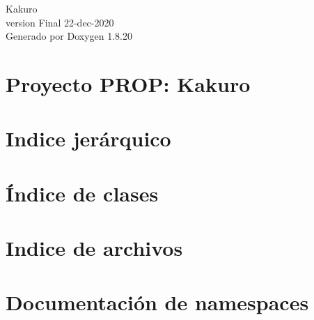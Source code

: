 \let\mypdfximage\pdfximage\def\pdfximage{\immediate\mypdfximage}\documentclass[twoside]{book}
\newcommand{\+}{\discretionary{\mbox{\scriptsize$\hookleftarrow$}}{}{}}
\newcommand{\clearemptydoublepage}{%
  \newpage{\pagestyle{empty}\cleardoublepage}%
}
\begin{document}
\hypersetup{pageanchor=false,
             bookmarksnumbered=true,
             pdfencoding=unicode
            }
\begin{titlepage}
\vspace*{7cm}
\begin{center}%
{\Large Kakuro \\[1ex]\large version Final 22-\/dec-\/2020 }\\
\vspace*{1cm}
{\large Generado por Doxygen 1.8.20}\\
\end{center}
\end{titlepage}
\clearemptydoublepage
{}
\tableofcontents
\clearemptydoublepage
{}
\hypersetup{pageanchor=true}

\chapter{Proyecto P\+R\+OP\+: Kakuro}
\label{index}\hypertarget{index}{}
\chapter{Indice jerárquico}

\chapter{Índice de clases}

\chapter{Indice de archivos}

\chapter{Documentación de namespaces}









\end{document}

